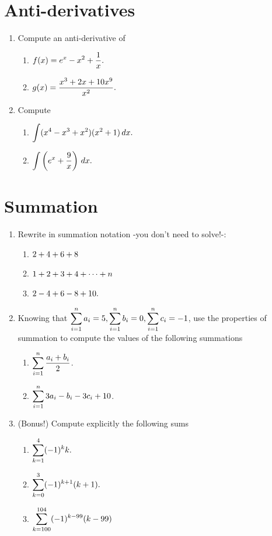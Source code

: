 \documentclass[10pt]{article}
\begin{document}
\pagestyle{otherpages}
\thispagestyle{firstpage}



\section{Anti-derivatives}
\begin{enumerate}
    \item Compute an anti-derivative of 
    \begin{enumerate}
        \item $\displaystyle f(x) = e^x - x^2 + \frac{1}{x}.$
        \item $\displaystyle g(x) = \frac{x^3+ 2x + 10x^9}{x^2}.$
    \end{enumerate}
    \item Compute 
    \begin{enumerate}
        \item $\displaystyle \int (x^4 - x^3 + x^2)(x^2 + 1)\,dx.$
        \item $\displaystyle \int \left(e^x  + \frac{9}{x}\right)\,dx.$
    \end{enumerate}    


\end{enumerate}

\newpage 

   \section{Summation}
   \begin{enumerate}

    
    \item Rewrite in summation notation -you don't need to solve!-:
    \begin{enumerate}
        \item $\displaystyle 2 + 4 + 6 + 8 $
        \item $\displaystyle 1+2+3+4 + \cdots + n$
        \item $\displaystyle 2 - 4 + 6 - 8 + 10.$
    \end{enumerate}

    \item Knowing that $\displaystyle \sum_{i=1}^{n}a_i=5,\sum_{i=1}^{n}b_i=0,\sum_{i=1}^{n}c_i=-1$, use the properties of summation to compute the values of the following summations
    \begin{enumerate}
        \item $\displaystyle \sum_{i=1}^n \frac{a_i+b_i}{2}$.
        \item $\displaystyle \sum_{i=1}^n 3a_i-b_i-3c_i+10$.
    \end{enumerate}
        \item (Bonus!) Compute explicitly the following sums 
    \begin{enumerate}
        \item $\displaystyle \sum_{k = 1}^4 (-1)^k k.$
        \item $\displaystyle \sum_{k = 0}^3 (-1)^{k+1} (k+1).$
        \item $\displaystyle \sum_{k = 100}^{104} (-1)^{k-99} (k-99)$
    \end{enumerate}
    \end{enumerate}
\end{document}
